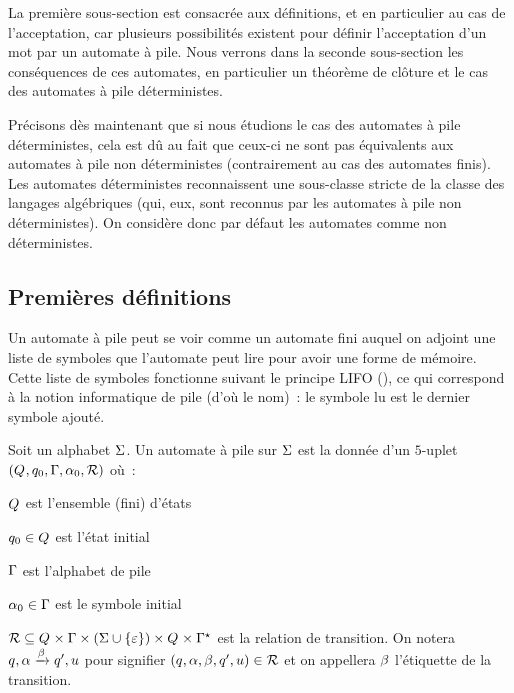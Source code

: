 La première sous-section est consacrée aux définitions, et en particulier au cas
de l'acceptation, car plusieurs possibilités existent pour définir l'acceptation
d'un mot par un automate à pile. Nous verrons dans la seconde sous-section les
conséquences de ces automates, en particulier un théorème de clôture et le cas
des automates à pile déterministes.

Précisons dès maintenant que si nous étudions le cas des automates à pile
déterministes, cela est dû au fait que ceux-ci ne sont pas équivalents aux
automates à pile non déterministes (contrairement au cas des automates finis).
Les automates déterministes reconnaissent une sous-classe stricte de la classe
des langages algébriques (qui, eux, sont reconnus par les automates à pile non
déterministes). On considère donc par défaut les automates comme non
déterministes.

\subsection{Premières définitions}

Un automate à pile peut se voir comme un automate fini auquel on adjoint une
liste de symboles que l'automate peut lire pour avoir une forme de mémoire.
Cette liste de symboles fonctionne suivant le principe LIFO
(), ce qui correspond à la notion informatique
de pile (d'où le nom)~: le symbole lu est le dernier symbole ajouté.

\begin{definition}
  Soit un alphabet $\Sigma$. Un automate à pile sur $\Sigma$ est la donnée d'un
  $5$-uplet $(Q_{},q_{0},\Gamma,\alpha_0,\mathord{\mathrel{\mathcal{R}}})$ où~:
  \begin{itemize}
    \begin{minipage}{0.45\textwidth}
    \item $Q_{}$ est l'ensemble (fini) d'états
    \item $q_{0} \in Q_{}$ est l'état initial
    \end{minipage}
    \begin{minipage}{0.45\textwidth}
    \item $\Gamma$ est l'alphabet de pile
    \item $\alpha_0 \in \Gamma$ est le symbole initial
    \end{minipage}
    \vspace{-0.1cm}
  \item 
    $\mathord{\mathrel{\mathcal{R}}} \subseteq Q_{} \times \Gamma\times
    (\Sigma\cup \{\varepsilon\})\times Q_{} \times \Gamma^{\star}$
    est la relation de transition. On notera
    $q_{},\alpha \xrightarrow{\beta} q_{}',u$ pour signifier
    $(q_{},\alpha,\beta,q_{}',u) \in \mathord{\mathrel{\mathcal{R}}}$ et on appellera
    $\beta$ l'étiquette de la transition.
  \end{itemize}
\end{definition}

